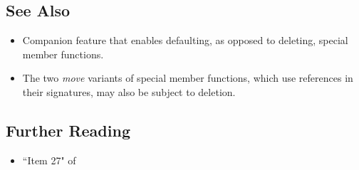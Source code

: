 \hspace*{\fill}

\subsection[See Also]{See Also}\label{see-also}

\begin{itemize}
\item{%
Companion feature that enables defaulting, as opposed to deleting, special member functions.}
\item{%
The two \emph{move} variants of special member functions, which use  references in their signatures, may also be subject to deletion.}
\end{itemize}

\subsection[Further Reading]{Further Reading}\label{further-reading}

\begin{itemize}
\item{``Item 27" of \cite{meyers15b}}
\end{itemize}

